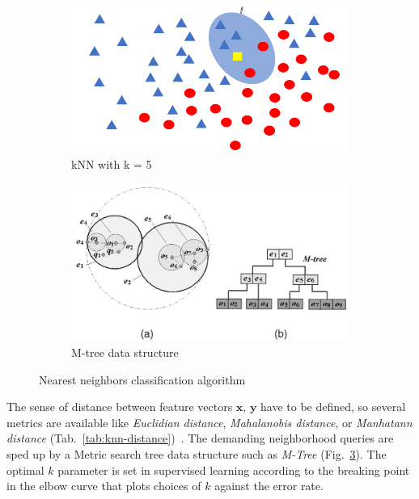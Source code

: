 \begin{figure}[ht]
    \centering
    \begin{subfigure}[b]{0.49\textwidth}
        \includegraphics[width=\textwidth]{assets/kNN.png}
        \caption{kNN with k = 5}
        \label{fig:knn}
    \end{subfigure}
    \hfill
    \begin{subfigure}[b]{0.49\textwidth}
        \includegraphics[width=\textwidth]{assets/M-tree.png}
        \caption{M-tree data structure}
        \label{fig:m-tree}
    \end{subfigure}
    \caption{Nearest neighbors classification algorithm~\cite{chen_skyline_2009}}
\end{figure}


The sense of distance between feature vectors $\mathbf{x}$, $\mathbf{y}$ have to be defined, so several metrics are available like \emph{Euclidian distance}, \emph{Mahalanobis distance}, or \emph{Manhatann distance} (Tab.~\ref{tab:knn-distance})~\cite{sheng_review_2020}. The demanding neighborhood queries are sped up by a Metric search tree data structure such as \emph{M-Tree} (Fig.~\ref{fig:m-tree}). The optimal $k$ parameter is set in supervised learning according to the breaking point in the elbow curve that plots choices of $k$ against the error rate.

